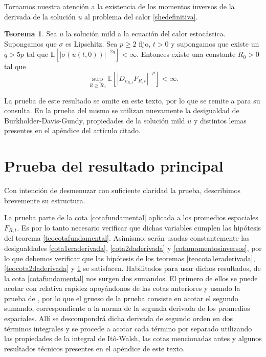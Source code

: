 \documentclass[letterpaper,twoside,12pt]{book}
\newcommand{\E}{\mathbb{E}}
\newcommand{\1}{\mathds{1}}
\newcommand{\abs}[1]{\left\lvert #1 \right\rvert}
\theoremstyle{definition}
\theoremstyle{definition}
\newtheorem{teo}{Teorema}
\theoremstyle{remark}
\theoremstyle{definition}
\theoremstyle{definition}
\theoremstyle{definition}
\theoremstyle{definition}
\theoremstyle{definition}
\begin{document}
   Tornamos nuestra atención a la existencia de los momentos inversos de la derivada de la solución $u$ al problema del calor \eqref{shedefinitiva}.
\begin{teo}\label{teocotamomentosinversos}
   Sea $u$ la solución mild a la ecuación del calor estocástica. Supongamos que $\sigma$ es Lipschitz. Sea $p\geq2$ fijo, $t>0$ y supongamos que existe un $q>5p$ tal que $\E\left[\abs{\sigma(u(t,0))}^{-2q}\right]<\infty$. Entonces existe una constante $R_0>0$ tal que 
   \begin{equation}\label{cotamomentosinversos}
      \sup_{R\geq R_0}\E\left[\abs{D_{v_{R,t}}F_{R,t}}^{-p}\right]<\infty.
   \end{equation}
   
   \end{teo}
   La prueba de este resultado se omite en este texto, por lo que se remite a \cite[proposición 4.2]{KUZGUN202268} para su consulta. En la prueba del mismo se utilizan nuevamente la desigualdad de Burkholder-Davis-Gundy, propiedades de la solución mild $u$ y distintos lemas presentes en el apéndice del artículo citado.

\section{Prueba del resultado principal}
Con intención de desmenuzar con suficiente claridad la prueba, describimos brevemente su estructura.

La prueba parte de la cota \eqref{cotafundamental} aplicada a los promedios espaciales $F_{R,t}$. Es por lo tanto necesario verificar que dichas variables cumplen las hipótesis del teorema \ref{teocotafundamental}. Asimismo, serán usadas constantemente las desigualdades \eqref{cota1eraderivada}, \eqref{cota2daderivada} y \eqref{cotamomentosinversos}, por lo que debemos verificar que las hipótesis de los teoremas \ref{teocota1eraderivada}, \ref{teocota2daderivada} y \ref{teocotamomentosinversos} se satisfacen. Habilitados para usar dichos resultados, de la cota \eqref{cotafundamental} nos surgen dos sumandos. El primero de ellos se puede acotar con relativa rapidez apoyándonos de las cotas anteriores y usando la prueba de \cite[teorema 1.1]{HUANG20207170}, por lo que el grueso de la prueba consiste en acotar el segundo sumando, correspondiente a la norma de la segunda derivada de los promedios espaciales. Allí se descompondrá dicha derivada de segundo orden en dos términos integrales y se procede a acotar cada término por separado utilizando las propiedades de la integral de Itô-Walsh, las cotas mencionadas antes y algunos resultados técnicos presentes en el apéndice de este texto.
\end{document}
